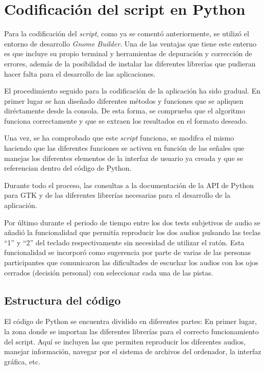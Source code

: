 \documentclass[11pt,a4paper,twoside]{book}
\begin{document}
        \section{Codificación del script en Python}
            Para la codificación del \textit{script}, como ya se comentó anteriormente, se utilizó el entorno de desarrollo \textit{Gnome Builder}. Una de las ventajas que tiene este enterno es que incluye su propio terminal y herramientas de depuración y corrección de errores, además de la posibilidad de instalar las diferentes librerías que pudieran hacer falta para el desarrollo de las aplicaciones.
            
            El procedimiento seguido para la codificación de la aplicación ha sido gradual. En primer lugar se han diseñado diferentes métodos y funciones que se apliquen diréctamente desde la consola. De esta forma, se comprueba que el algoritmo funciona correctamente y que se extraen los resultados en el formato deseado.
            
            Una vez, se ha comprobado que este \textit{script} funciona, se modifca el mismo haciendo que las diferentes funciones se activen en función de las señales que manejas los diferentes elementos de la interfaz de usuario ya creada y que se referencian dentro del código de Python.
            
            Durante todo el proceso, las consultas a la documentación de la API de Python para GTK \cite{GTKAPI} y de las diferentes librerías necesarias para el desarrollo de la aplicación.
            
            Por último durante el periodo de tiempo entre los dos tests subjetivos de audio se añadió la funcionalidad que permitía reproducir los dos audios pulsando las teclas ``1'' y ``2'' del teclado respectivamente sin necesidad de utilizar el ratón. Esta funcionalidad se incorporó como sugerencia por parte de varias de las personas participantes que comunicaron las dificultades de escuchar los audios con los ojos cerrados (decisión personal) con seleccionar cada una de las pistas.
            
            \subsection{Estructura del código}
                El código de Python se encuentra dividido en diferentes partes:
                En primer lugar, la zona donde se importan las diferentes librerías para el correcto funcionamiento del script. Aquí se incluyen las que permiten reproducir los diferentes audios, manejar información, navegar por el sistema de archivos del ordenador, la interfaz gráfica, etc.
                
\end{document}
